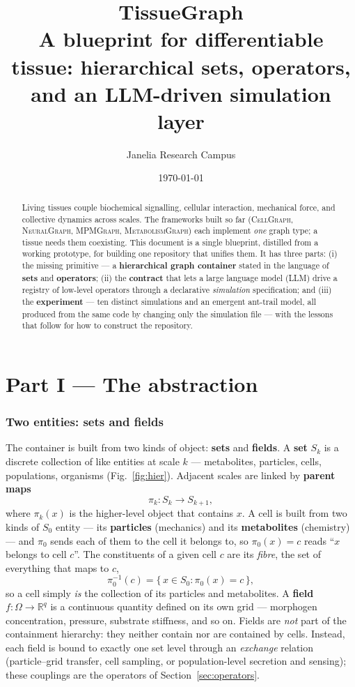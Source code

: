 \documentclass[11pt]{article}
\title{\textbf{TissueGraph}\\[3pt]
\large A blueprint for differentiable tissue: hierarchical sets, operators,\\
and an LLM-driven simulation layer}
\author{Janelia Research Campus}
\date{\today}
\begin{document}
\maketitle

\begin{abstract}
Living tissues couple biochemical signalling, cellular interaction, mechanical
force, and collective dynamics across scales. The frameworks built so far
(\textsc{CellGraph}, \textsc{NeuralGraph}, \textsc{MPMGraph},
\textsc{MetabolismGraph}) each implement \emph{one} graph type; a tissue needs
them coexisting. This document is a single blueprint, distilled from a working
prototype, for building one repository that unifies them. It has three parts:
(i) the missing primitive --- a \textbf{hierarchical graph container} stated in
the language of \textbf{sets} and \textbf{operators}; (ii) the \textbf{contract}
that lets a large language model (LLM) drive a registry of low-level operators
through a declarative \emph{simulation} specification; and (iii) the
\textbf{experiment} --- ten distinct simulations and an emergent ant-trail model,
all produced from the same code by changing only the simulation file --- with the
lessons that follow for how to construct the repository.
\end{abstract}

\part*{Part I --- The abstraction}

\section{Two entities: sets and fields}

The container is built from two kinds of object: \textbf{sets} and \textbf{fields}.
A \textbf{set} $S_k$ is a discrete collection of like entities at scale $k$ ---
metabolites, particles, cells, populations, organisms (Fig.~\ref{fig:hier}).
Adjacent scales are linked by \textbf{parent maps}
\[
  \pi_k : S_k \longrightarrow S_{k+1},
\]
where $\pi_k(x)$ is the higher-level object that contains $x$. A cell is built from
two kinds of $S_0$ entity --- its \textbf{particles} (mechanics) and its
\textbf{metabolites} (chemistry) --- and $\pi_0$ sends each of them to the cell it
belongs to, so $\pi_0(x)=c$ reads ``$x$ belongs to cell $c$''. The constituents of a
given cell $c$ are its \emph{fibre}, the set of everything that maps to $c$,
\[
  \pi_0^{-1}(c)=\{\,x\in S_0 : \pi_0(x)=c\,\},
\]
so a cell simply \emph{is} the collection of its particles and metabolites.
A \textbf{field} $f:\Omega\to\mathbb{R}^q$ is a continuous quantity defined on its
own grid --- morphogen concentration, pressure, substrate stiffness, and so on.
Fields are \emph{not} part of the containment hierarchy: they neither contain nor
are contained by cells. Instead, each field is bound to exactly one set level
through an \emph{exchange} relation (particle--grid transfer, cell sampling, or
population-level secretion and sensing); these couplings are the operators of
Section~\ref{sec:operators}.
\end{document}
